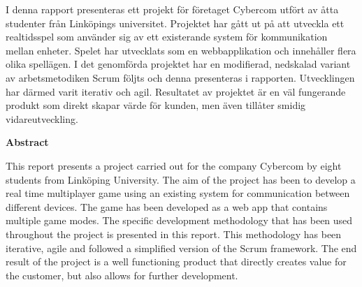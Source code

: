 {\justify
I denna rapport presenteras ett projekt för företaget Cybercom utfört av åtta studenter från Linköpings universitet. Projektet har gått ut på att utveckla ett realtidsspel som använder sig av ett existerande system för kommunikation mellan enheter. Spelet har utvecklats som en webbapplikation och innehåller flera olika spellägen. I det genomförda projektet har en modifierad, nedskalad variant av arbetsmetodiken Scrum följts och denna presenteras i rapporten. Utvecklingen har därmed varit iterativ och agil. Resultatet av projektet är en väl fungerande produkt som direkt skapar värde för kunden, men även tillåter smidig vidareutveckling.\\[1in]\par
}
{\centering
  \indent\textbf{Abstract}\par
}
This report presents a project carried out for the company Cybercom by eight students from Linköping University. The aim of the project has been to develop a real time multiplayer game using an existing system for communication between different devices. The game has been developed as a web app that contains multiple game modes. The specific development methodology that has been used throughout the project is presented in this report. This methodology has been iterative, agile and followed a simplified version of the Scrum framework. The end result of the project is a well functioning product that directly creates value for the customer, but also allows for further development.
